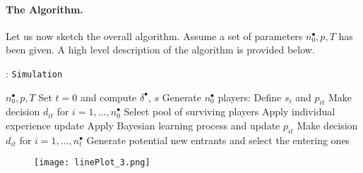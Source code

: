 \documentclass{article}
\begin{document}
\paragraph{The Algorithm.} Let us now sketch the overall algorithm. Assume a set of parameters
$n^\bullet_0, p, T$ has been given. A high level description of the algorithm
is provided below.



\begin{algorithm}
  \caption{: \texttt{Simulation} } \label{algo:simulation1}
  \begin{algorithmic}[1]
    \REQUIRE $n^\bullet_0, p, T$
    \STATE Set $t=0$ and compute $\delta^\bullet$, $s$ \hfill
    \STATE Generate $n^\bullet_0$ players: Define $s_i$ and $p_{it}$\hfill
    \STATE Make decision $d_{it}$ for $i=1,\dots,n^\bullet_0$ \hfill
    \STATE Select pool of surviving players \hfill {}
    \STATE Apply individual experience update \hfill
    \STATE Apply Bayesian learning process and update $p_{it}$ \hfill
    \STATE Make decision $d_{it}$ for $i=1,\dots,n^\bullet_t$ \hfill
    \STATE Generate potential new entrants and select the entering ones \hfill
    \ENDFOR
  \end{algorithmic}
\end{algorithm}


\begin{sidewaysfigure}
  \begin{center}
    \texttt{[image: linePlot\_3.png]}
    \label{fig:simulation}
  \end{center}
\end{sidewaysfigure}
\end{document}
